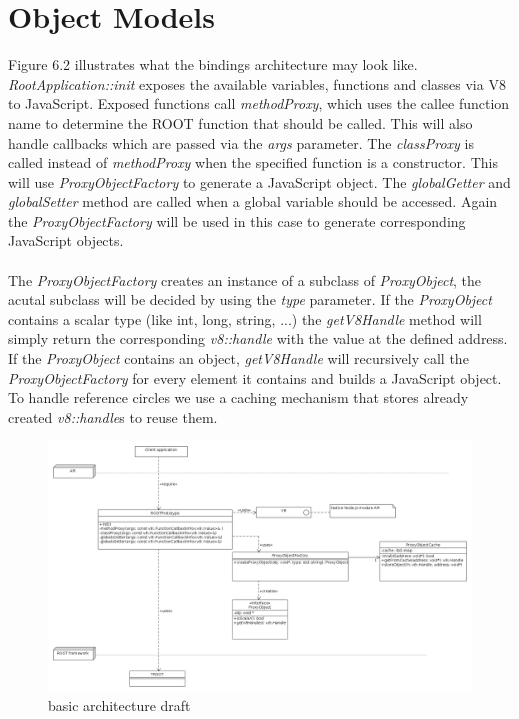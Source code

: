 \pagebreak[4]

\section{Object Models}
Figure 6.2 illustrates what the bindings architecture may look like.
\textit{RootApplication::init} exposes the available variables, functions and classes via V8 to JavaScript.
Exposed functions call \textit{methodProxy}, which uses the callee function name to determine the ROOT function that should be called. This will also handle callbacks which are passed via the \textit{args} parameter.
The \textit{classProxy} is called instead of \textit{methodProxy} when the specified function is a constructor. This will use \textit{ProxyObjectFactory} to generate a JavaScript object.
The \textit{globalGetter} and \textit{globalSetter} method are called when a global variable should be accessed. Again the \textit{ProxyObjectFactory} will be used in this case to generate corresponding JavaScript objects.
\\\\
The \textit{ProxyObjectFactory} creates an instance of a subclass of \textit{ProxyObject}, the acutal subclass will be decided by using the \textit{type} parameter.
If the \textit{ProxyObject} contains a scalar type (like int, long, string, ...) the \textit{getV8Handle} method will simply return the corresponding \textit{v8::handle} with the value at the defined address.
If the \textit{ProxyObject} contains an object, \textit{getV8Handle} will recursively call the \textit{ProxyObjectFactory} for every element it contains and builds a JavaScript object.
To handle reference circles we use a caching mechanism that stores already created \textit{v8::handle}s to reuse them.

\begin{figure}[htb]
	\centering
	\includegraphics[width=18cm]{./latex/resources/architecture.png}
	\caption{basic architecture draft}
\end{figure}

